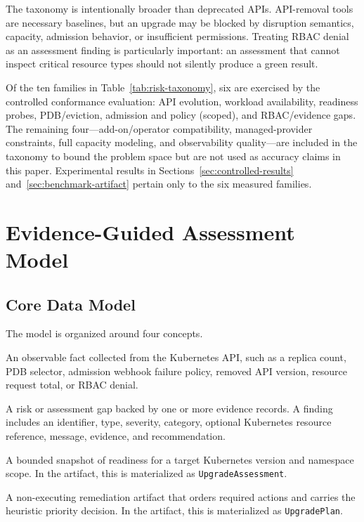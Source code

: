 \documentclass[10pt,journal]{IEEEtran}
\newcommand{\crd}[1]{\texttt{#1}}
\begin{document}
The taxonomy is intentionally broader than deprecated APIs. API-removal tools are necessary baselines, but an upgrade may be blocked by disruption semantics, capacity, admission behavior, or insufficient permissions. Treating RBAC denial as an assessment finding is particularly important: an assessment that cannot inspect critical resource types should not silently produce a green result.

Of the ten families in Table~\ref{tab:risk-taxonomy}, six are exercised by the controlled conformance evaluation: API evolution, workload availability, readiness probes, PDB/eviction, admission and policy (scoped), and RBAC/evidence gaps. The remaining four---add-on/operator compatibility, managed-provider constraints, full capacity modeling, and observability quality---are included in the taxonomy to bound the problem space but are not used as accuracy claims in this paper. Experimental results in Sections~\ref{sec:controlled-results} and~\ref{sec:benchmark-artifact} pertain only to the six measured families.

\section{Evidence-Guided Assessment Model}
\subsection{Core Data Model}
The model is organized around four concepts.
\begin{description}[leftmargin=*,style=nextline]
  \item[Evidence.] An observable fact collected from the Kubernetes API, such as a replica count, PDB selector, admission webhook failure policy, removed API version, resource request total, or RBAC denial.
  \item[Finding.] A risk or assessment gap backed by one or more evidence records. A finding includes an identifier, type, severity, category, optional Kubernetes resource reference, message, evidence, and recommendation.
  \item[Assessment.] A bounded snapshot of readiness for a target Kubernetes version and namespace scope. In the artifact, this is materialized as \crd{UpgradeAssessment}.
  \item[Plan.] A non-executing remediation artifact that orders required actions and carries the heuristic priority decision. In the artifact, this is materialized as \crd{UpgradePlan}.
\end{description}
\end{document}
